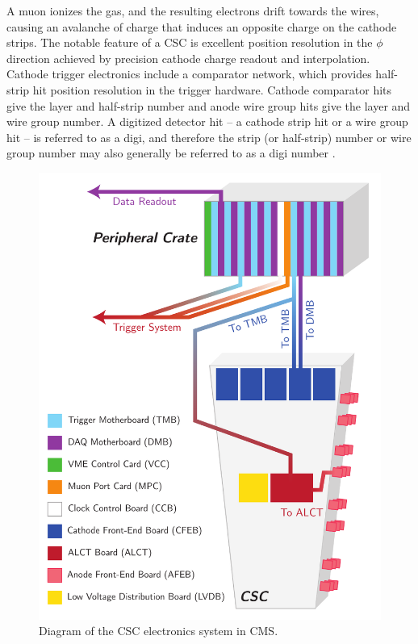 A muon ionizes the gas, and the resulting electrons drift towards the wires, causing an avalanche of charge that induces an opposite charge on the cathode strips. The notable feature of a CSC is excellent position resolution in the $\phi$ direction achieved by precision cathode charge readout and interpolation. Cathode trigger electronics include a comparator network, which provides half-strip hit position resolution in the trigger hardware. Cathode comparator hits give the layer and half-strip number and anode wire group hits give the layer and wire group number. A digitized detector hit -- a cathode strip hit or a wire group hit -- is referred to as a digi, and therefore the strip (or half-strip) number or wire group number may also generally be referred to as a digi number \cite{Hauser:814259,Baarmand:1999ka,Acosta:200826}.

\begin{figure}[p]
	\centering
	\includegraphics[width=\dummyFigWidth]{figures/neutron/fig_CSC_electronics.pdf}
	\caption{Diagram of the CSC electronics system in CMS.}
	\label{fig:CSC_electronics}
\end{figure}

